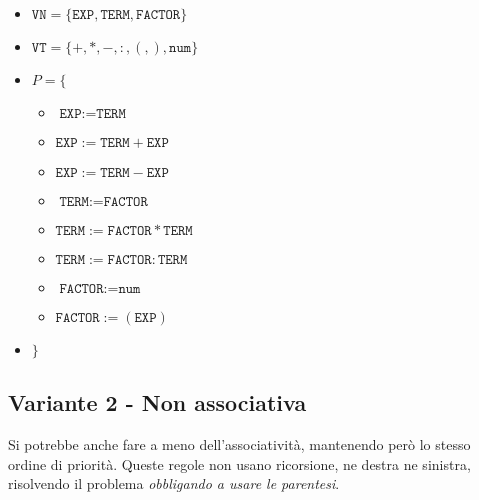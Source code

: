 \begin{itemize}[label={}]
    \item $\texttt{VN} = \{ \texttt{EXP}, \texttt{TERM}, \texttt{FACTOR}\}$
    \item $\texttt{VT} = \{+, *, -, :, (, ), \texttt{num}\}$
    \item $P = \{$
    \begin{itemize}[label={}]
        \item $\texttt{EXP} := \texttt{TERM}$
        \item $\texttt{EXP} := \texttt{TERM} + \texttt{EXP}$
        \item $\texttt{EXP} := \texttt{TERM} - \texttt{EXP}$
        \item $\texttt{TERM} := \texttt{FACTOR}$
        \item $\texttt{TERM} := \texttt{FACTOR} * \texttt{TERM}$
        \item $\texttt{TERM} := \texttt{FACTOR} : \texttt{TERM}$
        \item $\texttt{FACTOR} := \texttt{num}$
        \item $\texttt{FACTOR} := ( \texttt{EXP})$
    \end{itemize}
    \item $\}$
\end{itemize}
\setlist{}


\subsection{Variante 2 - Non associativa}
Si potrebbe anche fare a meno dell'associatività, mantenendo però lo stesso ordine di priorità. Queste regole non usano ricorsione, ne destra ne sinistra, risolvendo il problema \textit{obbligando a usare le parentesi}.

